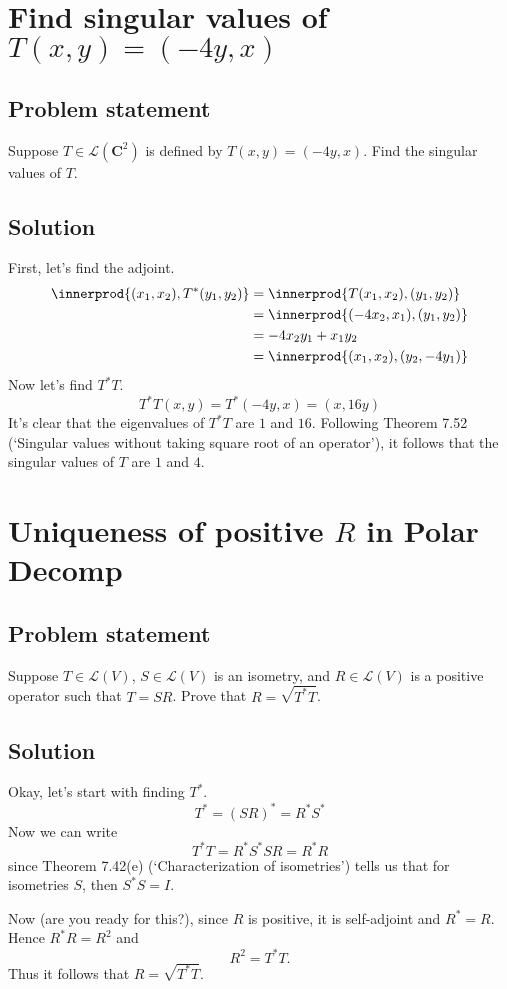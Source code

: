 \documentclass{article}
\DeclarePairedDelimiter{\innerprod}\langle\rangle
\begin{document}
\clearpage

\section{Find singular values of $T(x,y)=(-4y,x)$}
\subsection*{Problem statement}
Suppose $T\in\mathcal{L}(\mathbf{C}^2)$ is defined by $T(x,y)=(-4y,x)$. Find the singular values of $T$.

\subsection*{Solution}
First, let's find the adjoint.
\begin{align*}
    \innerprod{(x_1,x_2),T^*(y_1,y_2)}&=\innerprod{T(x_1,x_2),(y_1,y_2)}\\
    &= \innerprod{(-4x_2,x_1),(y_1,y_2)}\\
    &= -4x_2y_1+x_1y_2\\
    &=\innerprod{(x_1,x_2),(y_2,-4y_1)}
\end{align*}
Now let's find $T^*T$.
\[T^*T(x,y)=T^*(-4y,x)=(x,16y)\]
It's clear that the eigenvalues of $T^*T$ are $1$ and $16$. Following Theorem 7.52 (`Singular values without taking square root of an operator'), it follows that the singular values of $T$ are $1$ and $4$.

\clearpage

\renewcommand{\thesection}{8}
\section{Uniqueness of positive $R$ in Polar Decomp}
\subsection*{Problem statement}
Suppose $T\in\mathcal{L}(V)$, $S\in\mathcal{L}(V)$ is an isometry, and $R\in\mathcal{L}(V)$ is a positive operator such that $T=SR$. Prove that $R=\sqrt{T^*T}$.

\subsection*{Solution}
Okay, let's start with finding $T^*$.
\[T^*=(SR)^*=R^*S^*\]
Now we can write
\[T^*T=R^*S^*SR=R^*R\]
since Theorem 7.42(e) (`Characterization of isometries') tells us that for isometries $S$, then $S^*S=I$. 

Now (are you ready for this?), since $R$ is positive, it is self-adjoint and $R^*=R$. Hence $R^*R=R^2$ and
\[R^2=T^*T.\]
Thus it follows that $R=\sqrt{T^*T}$.
\end{document}
